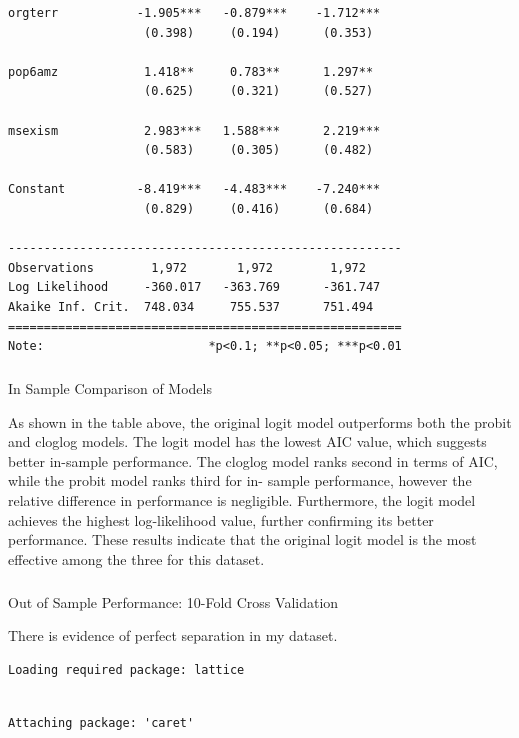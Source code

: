 \documentclass[
  letterpaper,
  DIV=11,
  numbers=noendperiod]{scrartcl}
\makeatletter
\let\oldsubparagraph\subparagraph
\renewcommand{\subparagraph}{
    \@ifstar
      \xxxSubParagraphStar
      \xxxSubParagraphNoStar
  }
\newcommand{\xxxSubParagraphStar}[1]{\oldsubparagraph*{#1}\mbox{}}
\newcommand{\xxxSubParagraphNoStar}[1]{\oldsubparagraph{#1}\mbox{}}
\makeatother
\begin{document}
\begin{verbatim}
orgterr           -1.905***   -0.879***    -1.712***   
                   (0.398)     (0.194)      (0.353)    
                                                       
pop6amz            1.418**     0.783**      1.297**    
                   (0.625)     (0.321)      (0.527)    
                                                       
msexism            2.983***   1.588***      2.219***   
                   (0.583)     (0.305)      (0.482)    
                                                       
Constant          -8.419***   -4.483***    -7.240***   
                   (0.829)     (0.416)      (0.684)    
                                                       
-------------------------------------------------------
Observations        1,972       1,972        1,972     
Log Likelihood     -360.017   -363.769      -361.747   
Akaike Inf. Crit.  748.034     755.537      751.494    
=======================================================
Note:                       *p<0.1; **p<0.05; ***p<0.01
\end{verbatim}

\subparagraph{In Sample Comparison of
Models}\label{in-sample-comparison-of-models}

As shown in the table above, the original logit model outperforms both
the probit and cloglog models. The logit model has the lowest AIC value,
which suggests better in-sample performance. The cloglog model ranks
second in terms of AIC, while the probit model ranks third for in-
sample performance, however the relative difference in performance is
negligible. Furthermore, the logit model achieves the highest
log-likelihood value, further confirming its better performance. These
results indicate that the original logit model is the most effective
among the three for this dataset.

\subparagraph{Out of Sample Performance: 10-Fold Cross
Validation}\label{out-of-sample-performance-10-fold-cross-validation}

There is evidence of perfect separation in my dataset.

\begin{verbatim}
Loading required package: lattice
\end{verbatim}

\begin{verbatim}

Attaching package: 'caret'
\end{verbatim}
\end{document}

